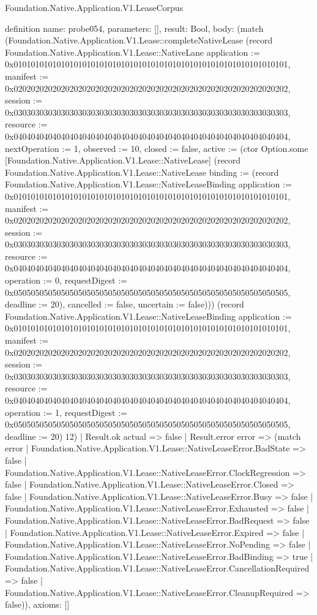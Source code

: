\begin{lexlean}{Foundation.Native.Application.V1.LeaseCorpus}
\begin{semanticmodule}
definition{
  name: probe054,
  parameters: [],
  result: Bool,
  body: (match (Foundation.Native.Application.V1.Lease::completeNativeLease (record Foundation.Native.Application.V1.Lease::NativeLane {application := 0x0101010101010101010101010101010101010101010101010101010101010101, manifest := 0x0202020202020202020202020202020202020202020202020202020202020202, session := 0x0303030303030303030303030303030303030303030303030303030303030303, resource := 0x0404040404040404040404040404040404040404040404040404040404040404, nextOperation := 1, observed := 10, closed := false, active := (ctor Option.some [Foundation.Native.Application.V1.Lease::NativeLease] (record Foundation.Native.Application.V1.Lease::NativeLease {binding := (record Foundation.Native.Application.V1.Lease::NativeLeaseBinding {application := 0x0101010101010101010101010101010101010101010101010101010101010101, manifest := 0x0202020202020202020202020202020202020202020202020202020202020202, session := 0x0303030303030303030303030303030303030303030303030303030303030303, resource := 0x0404040404040404040404040404040404040404040404040404040404040404, operation := 0, requestDigest := 0x0505050505050505050505050505050505050505050505050505050505050505, deadline := 20}), cancelled := false, uncertain := false}))}) (record Foundation.Native.Application.V1.Lease::NativeLeaseBinding {application := 0x0101010101010101010101010101010101010101010101010101010101010101, manifest := 0x0202020202020202020202020202020202020202020202020202020202020202, session := 0x0303030303030303030303030303030303030303030303030303030303030303, resource := 0x0404040404040404040404040404040404040404040404040404040404040404, operation := 1, requestDigest := 0x0505050505050505050505050505050505050505050505050505050505050505, deadline := 20}) 12)
    | Result.ok actual => false
    | Result.error error => (match error
      | Foundation.Native.Application.V1.Lease::NativeLeaseError.BadState => false
      | Foundation.Native.Application.V1.Lease::NativeLeaseError.ClockRegression => false
      | Foundation.Native.Application.V1.Lease::NativeLeaseError.Closed => false
      | Foundation.Native.Application.V1.Lease::NativeLeaseError.Busy => false
      | Foundation.Native.Application.V1.Lease::NativeLeaseError.Exhausted => false
      | Foundation.Native.Application.V1.Lease::NativeLeaseError.BadRequest => false
      | Foundation.Native.Application.V1.Lease::NativeLeaseError.Expired => false
      | Foundation.Native.Application.V1.Lease::NativeLeaseError.NoPending => false
      | Foundation.Native.Application.V1.Lease::NativeLeaseError.BadBinding => true
      | Foundation.Native.Application.V1.Lease::NativeLeaseError.CancellationRequired => false
      | Foundation.Native.Application.V1.Lease::NativeLeaseError.CleanupRequired => false)),
  axioms: []
}


\end{semanticmodule}
\end{lexlean}
